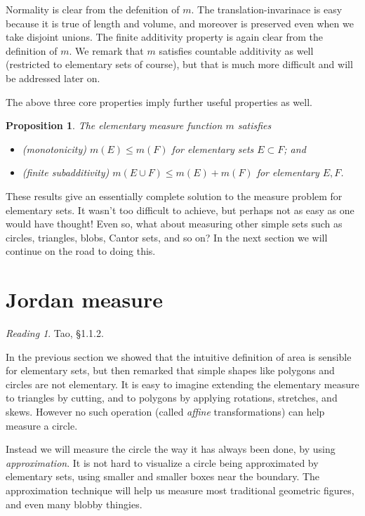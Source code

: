 \documentclass[11pt,oneside]{amsbook}
\theoremstyle{definition}
\theoremstyle{plain}
\newtheorem{prop}[thm]{Proposition}
\theoremstyle{definition}
\theoremstyle{remark}
\newtheorem*{reading}{Reading}
\numberwithin{equation}{section}
\numberwithin{figure}{section}
\begin{document}
Normality is clear from the defenition of $m$. The translation-invarinace is easy because it is true of length and volume, and moreover is preserved even when we take disjoint unions. The finite additivity property is again clear from the definition of $m$. We remark that $m$ satisfies countable additivity as well (restricted to elementary sets of course), but that is much more difficult and will be addressed later on.

The above three core properties imply further useful properties as well.

\begin{prop}
  The elementary measure function $m$ satisfies
  \begin{itemize}
  \item (monotonicity) $m(E)\leq m(F)$ for elementary sets $E\subset F$; and
  \item (finite subadditivity) $m(E\cup F)\leq m(E)+m(F)$ for elementary $E,F$.
  \end{itemize}
\end{prop}

These results give an essentially complete solution to the measure problem for elementary sets. It wasn't too difficult to achieve, but perhaps not as easy as one would have thought! Even so, what about measuring other simple sets such as circles, triangles, blobs, Cantor sets, and so on? In the next section we will continue on the road to doing this.


\section{Jordan measure}

\begin{reading}
  Tao, \S1.1.2.
\end{reading}

In the previous section we showed that the intuitive definition of area is sensible for elementary sets, but then remarked that simple shapes like polygons and circles are not elementary. It is easy to imagine extending the elementary measure to triangles by cutting, and to polygons by applying rotations, stretches, and skews. However no such operation (called \emph{affine} transformations) can help measure a circle.

Instead we will measure the circle the way it has always been done, by using \emph{approximation}. It is not hard to visualize a circle being approximated by elementary sets, using smaller and smaller boxes near the boundary. The approximation technique will help us measure most traditional geometric figures, and even many blobby thingies.
\end{document}
